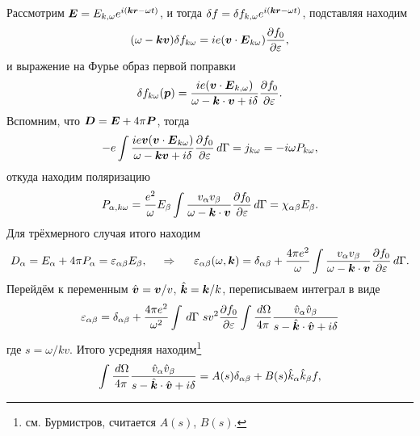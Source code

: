 Рассмотрим $\boldsymbol{E} = E_{k, \omega}e^{i\left(\boldsymbol{k} \boldsymbol{r} - \omega t\right)}$, и тогда $\delta f = \delta f_{k, \omega} e^{i\left(\boldsymbol{k} \boldsymbol{r} - \omega t\right)}$, подставляя находим 
\begin{equation*}
	(\omega - \boldsymbol{k} \boldsymbol{v}) \delta f_{k \omega} = i e (\boldsymbol{v} \cdot \boldsymbol{E}_{k \omega}) \frac{\partial f_0}{\partial \varepsilon},
\end{equation*}
и выражение на Фурье образ первой поправки
\begin{equation*}
	\delta f_{k \omega} (\boldsymbol{p}) = \frac{i e (\boldsymbol{v} \cdot \boldsymbol{E}_{k, \omega})}{\omega - \boldsymbol{k} \cdot \boldsymbol{v} + i \delta} \frac{\partial f_0}{\partial \varepsilon}.
\end{equation*}
Вспомним, что $\boldsymbol{D} = \boldsymbol{E} + 4 \pi \boldsymbol{P}$, тогда
\begin{equation*}
	- e \int \frac{i e \boldsymbol{v} (\boldsymbol{v} \cdot \boldsymbol{E}_{k \omega})}{\omega - \boldsymbol{k} \boldsymbol{v} + i \delta} \frac{\partial f_0}{\partial \varepsilon} \, d \Gamma = j_{k \omega} = - i \omega P_{k \omega},
\end{equation*}
откуда находим поляризацию
\begin{equation*}
	P_{\alpha, k \omega} = \frac{e^2}{\omega} E_\beta \int \frac{v_\alpha v_\beta}{\omega - \boldsymbol{k} \cdot \boldsymbol{v}} \frac{\partial f_0}{\partial \varepsilon} \, d \Gamma = \chi_{\alpha \beta} E_\beta.
\end{equation*}
Для трёхмерного случая итого находим
\begin{equation*}
	D_\alpha = E_\alpha + 4 \pi P_\alpha = \varepsilon_{\alpha \beta} E_\beta,
	\hspace{0.5cm} \Rightarrow \hspace{0.5cm}
	\varepsilon_{\alpha \beta} (\omega, \boldsymbol{k}) = \delta_{\alpha \beta} + \frac{4 \pi e^2}{\omega} \int \frac{v_\alpha v_\beta}{\omega - \boldsymbol{k} \cdot \boldsymbol{v}}	\frac{\partial f_0}{\partial \varepsilon} \, d \Gamma.
\end{equation*}
Перейдём к переменным $\hat{\boldsymbol{v}} = \boldsymbol{v}/v$, $\hat{\boldsymbol{k}} = \boldsymbol{k} / k$, переписываем интеграл в виде
\begin{equation*}
	\varepsilon_{\alpha \beta} = \delta_{\alpha \beta} + \frac{4 \pi e^2}{\omega^2} \int \, d \Gamma\ s v^2 \frac{\partial f_0}{\partial \varepsilon} \int \frac{\, d \Omega}{4 \pi} \frac{\hat{v}_\alpha \hat{v}_\beta}{s - \hat{\boldsymbol{k}} \cdot \hat{\boldsymbol{v}} + i \delta}	
\end{equation*}
где $s = \omega / k v$. Итого усредняя находим\footnote{
	см. Бурмистров, считается $A(s)$, $B(s)$.
} 
\begin{equation*}
	\int \frac{\, d \Omega}{4 \pi} \frac{\hat{v}_\alpha \hat{v}_\beta}{s - \hat{\boldsymbol{k}} \cdot \hat{\boldsymbol{v}} + i \delta} = 
	A(s) \delta_{\alpha \beta} + B(s) \hat{k}_\alpha \hat{k}_\beta f,
\end{equation*}

